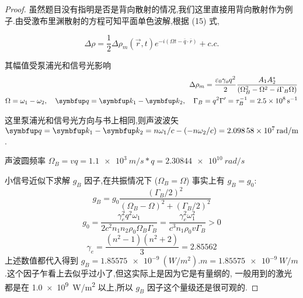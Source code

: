 \begin{proof}

虽然题目没有指明是否是背向散射的情况,我们这里直接用背向散射作为例子.由受激布里渊散射的方程可知平面单色波解,根据 (15) 式,

$$
\Delta \rho=\frac{1}{2} \Delta \rho_{m}(\vec{r}, t) e^{-i(\Omega t-\bar{q} \cdot \bar{r})}+c . c .
$$

其幅值受泵浦光和信号光影响
$$
\begin{aligned}
\Delta \rho_{m}=\frac{\varepsilon_{0} \gamma_{o} q^{2}}{2} \frac{A_{1} A_{2}^{*}}{\left(\Omega_{B}^{2}-\Omega^{2}-i \Gamma_{B} \Omega\right)}\\
\Omega = \omega_1-\omega_2,\quad \Vect{q}=\Vect{k}_1-\Vect{k}_2,\quad \Gamma_B=q^2\Gamma^\prime=\tau^{-1}_B=\SI{2.5e8}{s^{-1}}
\end{aligned}$$

这里泵浦光和信号光方向与书上相同,则声波波矢 $\Vect{q} = \Vect{k}_1-\Vect{k}_2=n\omega_1/c-(-n\omega_2/c)=\SI{2.09858e7}{rad/m}$.

声波圆频率 $\Omega_B= vq=\SI{1.1e3}{m/s}*q=\SI{2.30844e10}{rad/s}$

小信号近似下求解 $g_B$ 因子,在共振情况下 ($\Omega_B=\Omega$) 事实上有 $g_B=g_0$:
$$
g_{B}=g_{0} \frac{\left(\Gamma_{B} / 2\right)^{2}}{\left(\Omega_{B}-\Omega\right)^{2}+\left(\Gamma_{B} / 2\right)^{2}}
$$
$$
g_{0}=\frac{\gamma_{e}^{2} q^{2} \omega_{1}}{2 c^{2} n_{1} n_{2} \rho_{0} \Omega_{B} \Gamma_{B}}=\frac{\gamma_{e}^{2} \omega_{1}^{2}}{c^{3} n_{1} \rho_{0} v \Gamma_{B}}>0
$$
$$
\gamma_{e}=\frac{\left(n^{2}-1\right)\left(n^{2}+2\right)}{3}=2.85562
$$
上述数值都代入得到 $g_B=\SI{1.85575e-9}{(W/m^2).m}=\SI{1.85575e-9}{W/m}$.这个因子乍看上去似乎过小了,但这实际上是因为它是有量纲的,
一般用到的激光都是在 \SI{1.0e9}{W/m^2} 以上,所以 $g_B$ 因子这个量级还是很可观的.

\end{proof}